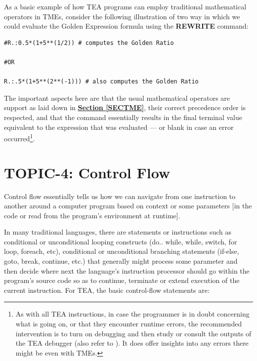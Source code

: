 \documentclass[a4paper, 18pt]{book} %
\begin{document}
{{{\begin{appendices}
\vspace{2em}

As a basic example of how TEA programs can employ traditional mathematical operators in TMEs, consider the following illustration of two way in which we could evaluate the Golden Expression formula using the \textbf{REWRITE} command:


\vspace{2em}

  \begin{tcolorbox}[teaterminalstyle, title=TEA and Mathematical OPERATORS: Example 1: Computing the Golden Ratio, breakable]
  \begin{lstlisting}[language=TEA,breaklines=true,]
#R.:0.5*(1+5**(1/2)) # computes the Golden Ratio

#OR

R.:.5*(1+5**(2**(-1))) # also computes the Golden Ratio
   \end{lstlisting}
  \end{tcolorbox}

\vspace{2em}

The important aspects here are that the usual mathematical operators are support as laid down in \textbf{\hyperref[SECTME]{Section \ref{SECTME}}}, their correct precedence order is respected, and that the command essentially results in the final terminal value equivalent to the expression that was evaluated --- or blank in case an error occurred\footnote{As with all TEA instructions, in case the programmer is in doubt concerning what is going on, or that they encounter runtime errors, the recommended intervention is to turn on debugging and then study or consult the outputs of the TEA debugger (also refer to \cite{Lutalo2025debug}). It does offer insights into any errors there might be even with TMEs.}.

\section{TOPIC-4: Control Flow}
\label{LEARNTEATOPICCF}


Control flow essentially tells us how we can navigate from one instruction to another around a computer program based on context or some parameters [in the code or read from the program's environment at runtime].

\vspace{2em}

 
In many traditional languages, there are statements or instructions such as conditional or unconditional looping constructs (do.. while, while, switch, for loop,  foreach, etc), conditional or unconditional branching statements (if-else, goto, break, continue, etc.) that generally might process some parameter and then decide where next the language's instruction processor should go within the program's source code so as to continue, terminate or extend execution of the current instruction. For TEA, the basic control-flow statements are:


\end{appendices}}}}
\end{document}
